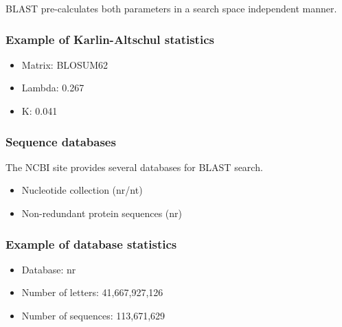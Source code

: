 BLAST pre-calculates both parameters in a search space independent manner.

%
%
\subsubsection*{Example of Karlin-Altschul statistics} 
\begin{itemize}
\item Matrix: BLOSUM62
\item Lambda: 0.267
\item K: 0.041
\end{itemize}

%
%
\subsubsection*{Sequence databases} 
The NCBI site provides several databases for BLAST search.
\begin{itemize}
\item Nucleotide collection (nr/nt)
\item Non-redundant protein sequences (nr)
\end{itemize}

%
%
\subsubsection*{Example of  database statistics} 
\begin{itemize}
\item Database: nr
\item Number of letters: 41,667,927,126
\item Number of sequences: 113,671,629
\end{itemize}

\bigskip 

%
